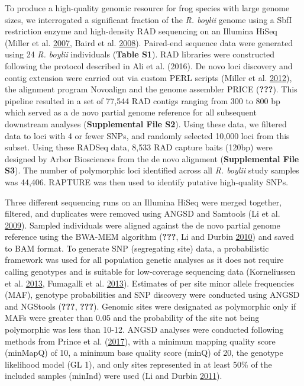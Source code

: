 \documentclass[proquest,12pt,final]{ucthesis-CA2012} %
\begin{document}
\begin{ucmainmatter}
To produce a high-quality genomic resource for frog species with large
genome sizes, we interrogated a significant fraction of the \emph{R.
boylii} genome using a SbfI restriction enzyme and high-density RAD
sequencing on an Illumina HiSeq (Miller et al.
\protect\hyperlink{ref-miller_rapid_2007}{2007}, Baird et al.
\protect\hyperlink{ref-baird_rapid_2008}{2008}). Paired-end sequence
data were generated using 24 \emph{R. boylii} individuals (\textbf{Table
S1}). RAD libraries were constructed following the protocol described in
Ali et al. (2016). De novo loci discovery and contig extension were
carried out via custom PERL scripts (Miller et al.
\protect\hyperlink{ref-miller_conserved_2012}{2012}), the alignment
program Novoalign and the genome assembler PRICE ({\textbf{???}}). This
pipeline resulted in a set of 77,544 RAD contigs ranging from 300 to 800
bp which served as a de novo partial genome reference for all subsequent
downstream analyses (\textbf{Supplemental File S2}). Using these data,
we filtered data to loci with 4 or fewer SNPs, and randomly selected
10,000 loci from this subset. Using these RADSeq data, 8,533 RAD capture
baits (120bp) were designed by Arbor Biosciences from the de novo
alignment (\textbf{Supplemental File S3}). The number of polymorphic
loci identified across all \emph{R. boylii} study samples was 44,406.
RAPTURE was then used to identify putative high-quality SNPs.

Three different sequencing runs on an Illumina HiSeq were merged
together, filtered, and duplicates were removed using ANGSD and Samtools
(Li et al. \protect\hyperlink{ref-li_sequence_2009}{2009}). Sampled
individuals were aligned against the de novo partial genome reference
using the BWA-MEM algorithm ({\textbf{???}}, Li and Durbin
\protect\hyperlink{ref-li_fast_2010}{2010}) and saved to BAM format. To
generate SNP (segregating site) data, a probabilistic framework was used
for all population genetic analyses as it does not require calling
genotypes and is suitable for low-coverage sequencing data (Korneliussen
et al. \protect\hyperlink{ref-korneliussen_calculation_2013}{2013},
Fumagalli et al.
\protect\hyperlink{ref-fumagalli_quantifying_2013}{2013}). Estimates of
per site minor allele frequencies (MAF), genotype probabilities and SNP
discovery were conducted using ANGSD and NGStools ({\textbf{???}},
{\textbf{???}}). Genomic sites were designated as polymorphic only if
MAFs were greater than 0.05 and the probability of the site not being
polymorphic was less than 10-12. ANGSD analyses were conducted following
methods from Prince et al.
(\protect\hyperlink{ref-prince_evolutionary_2017}{2017}), with a minimum
mapping quality score (minMapQ) of 10, a minimum base quality score
(minQ) of 20, the genotype likelihood model (GL 1), and only sites
represented in at least 50\% of the included samples (minInd) were used
(Li and Durbin \protect\hyperlink{ref-li_inference_2011}{2011}).


\end{ucmainmatter}
\end{document}
